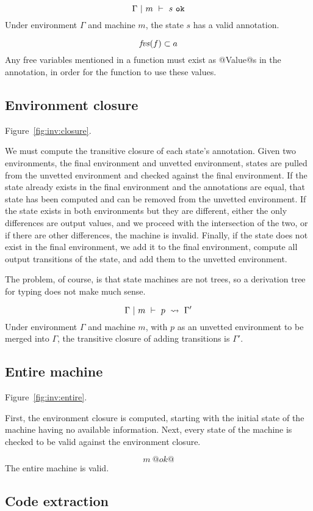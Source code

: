 $$ \Gamma ~|~ m ~\vdash~ s~\mathtt{ok} $$
Under environment $\Gamma$ and machine $m$, the state $s$ has a valid annotation.

$$ \mathit{fvs}(f) \subset a $$
Any free variables mentioned in a function must exist as @Value@s in the annotation, in order for the function to use these values.

\subsection{Environment closure}
Figure~\ref{fig:inv:closure}.

We must compute the transitive closure of each state's annotation.
Given two environments, the final environment and unvetted environment, states are pulled from the unvetted environment and checked against the final environment.
If the state already exists in the final environment and the annotations are equal, that state has been computed and can be removed from the unvetted environment.
If the state exists in both environments but they are different, either the only differences are output values, and we proceed with the intersection of the two, or if there are other differences, the machine is invalid.
Finally, if the state does not exist in the final environment, we add it to the final environment, compute all output transitions of the state, and add them to the unvetted environment.

The problem, of course, is that state machines are not trees, so a derivation tree for typing does not make much sense.

$$ \Gamma ~|~ m ~\vdash~ p ~\rightsquigarrow~ \Gamma' $$
Under environment $\Gamma$ and machine $m$, with $p$ as an unvetted environment to be merged into $\Gamma$, the transitive closure of adding transitions is $\Gamma'$.

\subsection{Entire machine}
Figure~\ref{fig:inv:entire}.

First, the environment closure is computed, starting with the initial state of the machine having no available information.
Next, every state of the machine is checked to be valid against the environment closure.

$$ m~@ok@ $$
The entire machine is valid.


\subsection{Code extraction}

